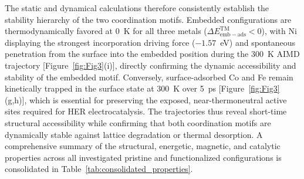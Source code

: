 \documentclass[journal=jacsat,manuscript=article]{achemso}
\begin{document}
{\color{revcolor}%
  The static and dynamical calculations therefore consistently establish the stability hierarchy of the two coordination motifs. Embedded configurations are thermodynamically favored at 0~K for all three metals ($\Delta E_{\mathrm{emb-ads}}^{\mathrm{TM}} < 0$), with Ni displaying the strongest incorporation driving force ($-1.57$~eV) and spontaneous penetration from the surface into the embedded position during the 300~K AIMD trajectory [Figure~\ref{fig:Fig3}(i)], directly confirming the dynamic accessibility and stability of the embedded motif. Conversely, surface-adsorbed Co and Fe remain kinetically trapped in the surface state at 300~K over 5~ps [Figure~\ref{fig:Fig3}(g,h)], which is essential for preserving the exposed, near-thermoneutral active sites required for HER electrocatalysis. The trajectories thus reveal short-time structural accessibility while confirming that both coordination motifs are dynamically stable against lattice degradation or thermal desorption. A comprehensive summary of the structural, energetic, magnetic, and catalytic properties across all investigated pristine and functionalized configurations is consolidated in Table~\ref{tab:consolidated_properties}.

}
\end{document}
